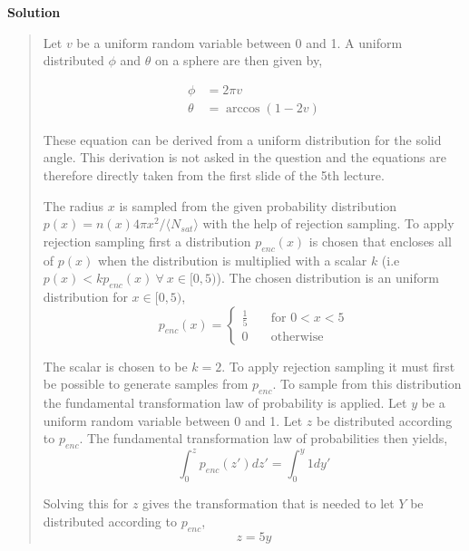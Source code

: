 \textbf{Solution} 
\begin{quote}
Let $v$ be a uniform random variable between 0 and 1. A uniform distributed $\phi$ and $\theta$ on a sphere are then given by,

\begin{align}
\phi &= 2 \pi v \\
\theta &=  \arccos(1-2v)
\end{align}

These equation can be derived from a uniform distribution for the solid angle. This derivation is not asked in the question and the equations are therefore directly taken from the first slide of the 5th lecture.

The radius $x$ is sampled from the given probability distribution $p(x) = n(x)4 \pi x^2/ \langle N_{sat} \rangle$ with the help of rejection sampling. To apply rejection sampling first a distribution $p_{enc}(x)$ is chosen that encloses all of $p(x)$ when the distribution is multiplied with a scalar $k$ (i.e $p(x) < kp_{enc}(x) \ \forall \ x \in[0,5)$). The chosen distribution is an uniform distribution for $x \in[0,5)$,
\begin{equation}
p_{enc}(x) = 
     \begin{cases}
       \frac{1}{5} &\quad\text{for $0< x < 5$} \\
       0  &\quad\text{otherwise}
     \end{cases}
\end{equation}  

The scalar is chosen to be $k = 2$. To apply rejection sampling it must first be possible to generate samples from $p_{enc}$. To sample from this distribution the fundamental transformation law of probability is applied. Let $y$ be a uniform random variable between 0 and 1.  Let $z$ be distributed according to $p_{enc}$. The fundamental transformation law of probabilities then yields, 
\begin{equation}
\int_0^z p_{enc}(z') dz' = \int_0^y 1 dy' 
\end{equation}

Solving this for $z$ gives the transformation that is needed to let $Y$ be distributed according to $p_{enc}$,
\begin{equation}
 z = 5y
 \label{eq:transf}
\end{equation}



\end{quote}
